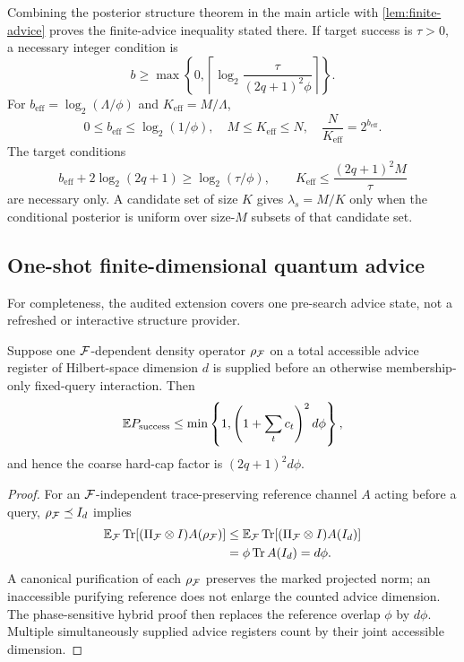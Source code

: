 Combining the posterior structure theorem in the main article with
\cref{lem:finite-advice} proves the finite-advice inequality stated there. If
target success is $\tau>0$, a necessary integer
condition is
\begin{equation}
 b\geq\max\left\{0,
 \left\lceil\log_2\frac{\tau}{(2q+1)^2\phi}\right\rceil\right\}.
\end{equation}
For $b_{\mathrm{eff}}=\log_2(\Lambda/\phi)$ and
$K_{\mathrm{eff}}=M/\Lambda$,
\begin{equation}
 0\leq b_{\mathrm{eff}}\leq\log_2(1/\phi),\quad
 M\leq K_{\mathrm{eff}}\leq N,\quad
 \frac{N}{K_{\mathrm{eff}}}=2^{b_{\mathrm{eff}}}.
\end{equation}
The target conditions
\begin{equation}
 b_{\mathrm{eff}}+2\log_2(2q+1)\geq\log_2(\tau/\phi),
 \qquad
 K_{\mathrm{eff}}\leq\frac{(2q+1)^2M}{\tau}
\end{equation}
are necessary only. A candidate set of size $K$ gives
$\lambda_s=M/K$ only when the conditional posterior is uniform over size-$M$
subsets of that candidate set.

\subsection{One-shot finite-dimensional quantum advice}

For completeness, the audited extension covers one pre-search advice state,
not a refreshed or interactive structure provider.

\begin{proposition}
Suppose one $\mathcal{F}$-dependent density operator $\rho_{\mathcal{F}}$ on a total accessible
advice register of Hilbert-space dimension $d$ is supplied before an otherwise
membership-only fixed-query interaction. Then
\begin{equation}
 \mathbb{E} P_{\mathrm{success}}
 \leq\min\left\{1,
 \left(1+\sum_t c_t\right)^2d\phi\right\},
\end{equation}
and hence the coarse hard-cap factor is $(2q+1)^2d\phi$.
\label{prop:quantum-advice}
\end{proposition}

\begin{proof}
For an $\mathcal{F}$-independent trace-preserving reference channel $A$ acting before a
query, $\rho_{\mathcal{F}}\preceq I_d$ implies
\begin{align}
 \mathbb{E}_{\mathcal{F}}\operatorname{Tr}[(\Pi_{\mathcal{F}}\otimes I)A(\rho_{\mathcal{F}})]
 &\leq\mathbb{E}_{\mathcal{F}}\operatorname{Tr}[(\Pi_{\mathcal{F}}\otimes I)A(I_d)]\\
 &=\phi\operatorname{Tr}A(I_d)=d\phi.
\end{align}
A canonical purification of each $\rho_{\mathcal{F}}$ preserves the marked projected
norm; an inaccessible purifying reference does not enlarge the counted advice
dimension. The phase-sensitive hybrid proof then replaces the reference
overlap $\phi$ by $d\phi$. Multiple simultaneously supplied advice registers
count by their joint accessible dimension.
\end{proof}

